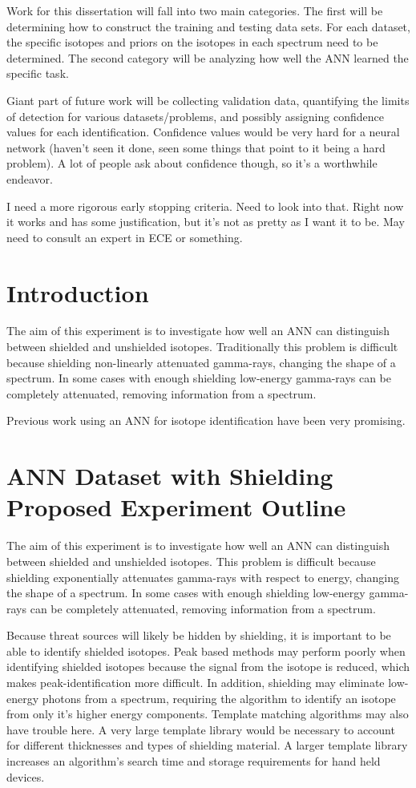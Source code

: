 \documentclass[thesis,tocnosub,noragright,centerchapter,12pt,fullpage]{uiucecethesis09}
\begin{document}
Work for this dissertation will fall into two main categories. The first will be determining how to construct the training and testing data sets. For each dataset, the specific isotopes and priors on the isotopes in each spectrum need to be determined.  The second category will be analyzing how well the ANN learned the specific task. 

Giant part of future work will be collecting validation data, quantifying the limits of detection for various datasets/problems, and possibly assigning confidence values for each identification. Confidence values would be very hard for a neural network (haven't seen it done, seen some things that point to it being a hard problem). A lot of people ask about confidence though, so it's a worthwhile endeavor.  

I need a more rigorous early stopping criteria. Need to look into that. Right now it works and has some justification, but it's not as pretty as I want it to be. May need to consult an expert in ECE or something.


\section{Introduction}

The aim of this experiment is to investigate how well an ANN can distinguish between shielded and unshielded isotopes. Traditionally this problem is difficult because shielding non-linearly attenuated gamma-rays, changing the shape of a spectrum. In some cases with enough shielding low-energy gamma-rays can be completely attenuated, removing information from a spectrum. 

Previous work using an ANN for isotope identification have been very promising.


\section{ANN Dataset with Shielding Proposed Experiment Outline}

The aim of this experiment is to investigate how well an ANN can distinguish between shielded and unshielded isotopes. This problem is difficult because shielding exponentially attenuates gamma-rays with respect to energy, changing the shape of a spectrum. In some cases with enough shielding low-energy gamma-rays can be completely attenuated, removing information from a spectrum. 

Because threat sources will likely be hidden by shielding, it is important to be able to identify shielded isotopes. Peak based methods may perform poorly when identifying shielded isotopes because the signal from the isotope is reduced, which makes peak-identification more difficult. In addition, shielding may eliminate low-energy photons from a spectrum, requiring the algorithm to identify an isotope from only it's higher energy components. Template matching algorithms may also have trouble here. A very large template library would be necessary to account for different thicknesses and types of shielding material. A larger template library increases an algorithm's search time and storage requirements for hand held devices.  
\end{document}
